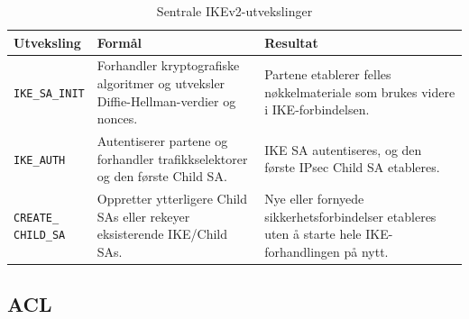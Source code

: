 \begin{table}[H]

\centering

\caption{Sentrale IKEv2-utvekslinger}

\label{tab:ikev2-utvekslinger}

\small

\renewcommand{\arraystretch}{1.25}

\begin{tabular}{@{}lll@{}}

\toprule

\parbox[t]{0.22\textwidth}{\textbf{Utveksling}} & \parbox[t]{0.31\textwidth}{\textbf{Formål}} & \parbox[t]{0.31\textwidth}{\textbf{Resultat}} \\

\midrule

\parbox[t]{0.22\textwidth}{\footnotesize\texttt{IKE\_SA\_INIT}} & \parbox[t]{0.31\textwidth}{\raggedright Forhandler kryptografiske algoritmer og utveksler Diffie-Hellman-verdier og nonces.} & \parbox[t]{0.31\textwidth}{\raggedright Partene etablerer felles nøkkelmateriale som brukes videre i IKE-forbindelsen.} \\

\addlinespace

\parbox[t]{0.22\textwidth}{\footnotesize\texttt{IKE\_AUTH}} & \parbox[t]{0.31\textwidth}{\raggedright Autentiserer partene og forhandler trafikkselektorer og den første Child SA.} & \parbox[t]{0.31\textwidth}{\raggedright IKE SA autentiseres, og den første IPsec Child SA etableres.} \\

\addlinespace

\parbox[t]{0.22\textwidth}{\footnotesize\texttt{CREATE\_}\newline\texttt{CHILD\_SA}} & \parbox[t]{0.31\textwidth}{\raggedright Oppretter ytterligere Child SAs eller rekeyer eksisterende IKE/Child SAs.} & \parbox[t]{0.31\textwidth}{\raggedright Nye eller fornyede sikkerhetsforbindelser etableres uten å starte hele IKE-forhandlingen på nytt.} \\

\bottomrule

\end{tabular}

\end{table}

\subsection{ACL}

